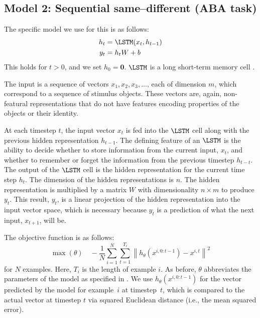\subsection{Model 2: Sequential same--different (ABA task)}\label{sec:model2}

The specific model we use for this is as follows:
%
\begin{align}
  h_{t} &= \LSTM(x_{t}, h_{t-1}) \label{eq:lstm-recur-supp}\\
  y_{t} &= h_{t}W + b\label{eq:lstm-predict-supp}
\end{align}
%
This holds for $t > 0$, and we set $h_{0} = \mathbf{0}$. $\LSTM$ is a long short-term memory cell \cite{hochreiter:1997}.

The input is a sequence of vectors $x_1, x_2, x_3, \dots$, each of dimension $m$, which correspond to a sequence of stimulus objects. These vectors are, again, non-featural representations that do not have features encoding properties of the objects or their identity.

At each timestep $t$, the input vector $x_t$ is fed into the $\LSTM$ cell along with the previous hidden representation $h_{t-1}$. The defining feature of an $\LSTM$ is the ability to decide whether to store information from the current input, $x_t$, and whether to remember or forget the information from the previous timestep $h_{t-t}$. The output of the $\LSTM$ cell is the hidden representation for the current time step $h_t$. The dimension of the hidden representations is $n$. The hidden representation is multiplied by a matrix $W$ with dimensionality $n \times m$ to produce $y_t$. This result, $y_t$, is a linear projection of the hidden representation into the input vector space, which is necessary because $y_t$ is a prediction of what the next input, $x_{t+1}$, will be.

The objective function is as follows:
%
\begin{equation}
\max(\theta)
\quad
-\frac{1}{N}
\sum_{i=1}^{N}
\sum_{t=1}^{T_{i}}
\left\| h_{\theta}\left(x^{i, 0:{t-1}}\right) - x^{i,t} \right\|^{2}
\end{equation}
%
for $N$ examples. Here, $T_{i}$ is the length of example $i$. As before, $\theta$ abbreviates the parameters of the model as specified in . We use $h_{\theta}(x^{i, 0:{t-1}})$ for the vector predicted by the model for example~$i$ at timestep~$t$, which is compared to the actual vector at timestep $t$ via squared Euclidean distance (i.e., the mean squared error).

